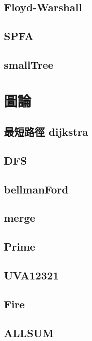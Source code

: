     \subsection{Floyd-Warshall}
        
    \subsection{SPFA}
        
    \subsection{smallTree}
        

\section{圖論}
    \subsection{最短路徑 dijkstra}
        
    \subsection{DFS}
        
    \subsection{bellmanFord}
        
    \subsection{merge}
          
    \subsection{Prime}
        
    \subsection{UVA12321}
        
    \subsection{Fire}
        
    \subsection{ALLSUM}
        
